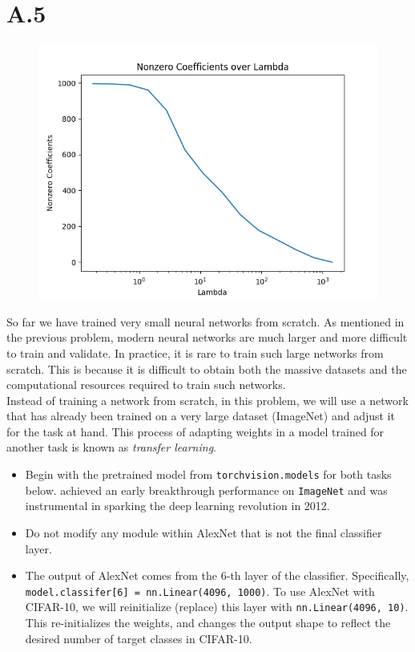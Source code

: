 \documentclass{article}
\newcommand{\1}{\mathbf{1}}
\begin{document}
\section*{A.5}
{\Large 

\begin{figure}[h]
  \centering
  \includegraphics[width=120mm]{../hw2-code/results/a4_a.png}
\end{figure}


So far we have trained very small neural networks from scratch. As mentioned in the previous problem, modern neural networks are much larger and more difficult to train and validate. In practice, it is rare to train such large networks from scratch. This is because it is difficult to obtain both the massive datasets and the computational resources required to train such networks. \\
 
 Instead of training a network from scratch, in this problem, we will use a network that has already been trained on a very large dataset (ImageNet) and adjust it for the task at hand. This process of adapting weights in a model trained for another task is known as \textit{transfer learning}.
\begin{itemize}
    \item Begin with the pretrained  model from \texttt{torchvision.models} for both tasks below.  achieved an early breakthrough performance on \texttt{ImageNet} and was instrumental in sparking the deep learning revolution in 2012.
    \item Do not modify any module within AlexNet that is not the final classifier layer.
    \item The output of AlexNet comes from the $6$-th layer of the classifier. Specifically, \texttt{model.classifer[6] = nn.Linear(4096, 1000)}. To use AlexNet with CIFAR-10, we will reinitialize (replace) this layer with \texttt{nn.Linear(4096, 10)}. This re-initializes the weights, and changes the output shape to reflect the desired number of target classes in CIFAR-10. 
\end{itemize}

}
\end{document}
